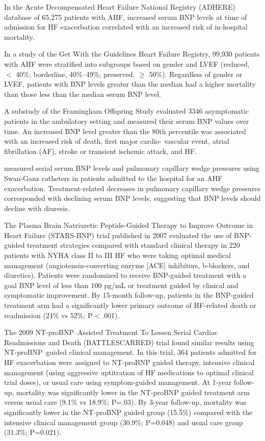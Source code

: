\documentclass[14pt,a4paper,onecolumn]{extarticle}
\begin{document}
In the Acute Decompensated Heart Failure National Registry (ADHERE) database of 65,275 patients with AHF, increased serum BNP levels at time of admission for HF exacerbation correlated with an increased risk of in-hospital mortality. \citep{Fonarow2007} %

In a study of the Get With the Guidelines Heart Failure Registry, 99,930 patients with AHF were stratified into subgroups based on gender and LVEF (reduced, $<$ 40\%; borderline, 40\%–49\%; preserved, $\geq$ 50\%). Regardless of gender or LVEF, patients with BNP levels greater than the median had a higher mortality than those less than the median serum BNP level. \citep{Hsich2013}  %

A substudy of the Framingham Offspring Study evaluated 3346 asymptomatic patients in the ambulatory setting and measured their serum BNP values over time. An increased BNP level greater than the 80th percentile was associated with an increased risk of death, first major cardio- vascular event, atrial fibrillation (AF), stroke or transient ischemic attack, and HF. \citep{Wang2004c} %

\citep{Kazanegra2001} measured serial serum BNP levels and pulmonary capillary wedge pressures using Swan-Ganz catheters in patients admitted to the hospital for an AHF exacerbation. Treatment-related decreases in pulmonary capillary wedge pressures corresponded with declining serum BNP levels, suggesting that BNP levels should decline with diuresis. %

The Plasma Brain Natriuretic Peptide-Guided Therapy to Improve Outcome in Heart Failure (STARS-BNP) trial published in 2007 evaluated the use of BNP-guided treatment strategies compared with standard clinical therapy in 220 patients with NYHA class II to III HF who were taking optimal medical management (angiotensin-converting enzyme [ACE] inhibitors, b-blockers, and diuretics). Patients were randomized to receive BNP-guided treatment with a goal BNP level of less than 100 pg/mL or treatment guided by clinical and symptomatic improvement. By 15-month follow-up, patients in the BNP-guided treatment arm had a significantly lower primary outcome of HF-related death or readmission (24\% vs 52\%; P$<$.001). \citep{Jourdain2007} %

The 2009 NT-proBNP–Assisted Treatment To Lessen Serial Cardiac Readmissions and Death (BATTLESCARRED) trial found similar results using NT-proBNP–guided clinical management. In this trial, 364 patients admitted for HF exacerbation were assigned to NT-proBNP guided therapy, intensive clinical management (using aggressive uptitration of HF medications to optimal clinical trial doses), or usual care using symptom-guided management. At 1-year follow-up, mortality was significantly lower in the NT-proBNP guided treatment arm versus usual care (9.1\% vs 18.9\%; P=.03). By 3-year follow-up, mortality was significantly lower in the NT-proBNP guided group (15.5\%) compared with the intensive clinical management group (30.9\%; P=0.048) and usual care group (31.3\%; P=0.021). \citep{Lainchbury2009} %
\end{document}

